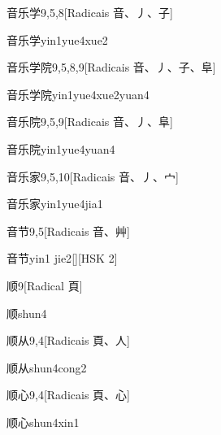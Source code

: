 \begin{entry}{音乐学}{9,5,8}[Radicais ⾳、⼃、⼦]
  \begin{phonetics}{音乐学}{yin1yue4xue2}
  \end{phonetics}
\end{entry}

\begin{entry}{音乐学院}{9,5,8,9}[Radicais ⾳、⼃、⼦、⾩]
  \begin{phonetics}{音乐学院}{yin1yue4xue2yuan4}
  \end{phonetics}
\end{entry}

\begin{entry}{音乐院}{9,5,9}[Radicais ⾳、⼃、⾩]
  \begin{phonetics}{音乐院}{yin1yue4yuan4}
  \end{phonetics}
\end{entry}

\begin{entry}{音乐家}{9,5,10}[Radicais ⾳、⼃、⼧]
  \begin{phonetics}{音乐家}{yin1yue4jia1}
  \end{phonetics}
\end{entry}

\begin{entry}{音节}{9,5}[Radicais ⾳、⾋]
  \begin{phonetics}{音节}{yin1 jie2}[][HSK 2]
  \end{phonetics}
\end{entry}

\begin{entry}{顺}{9}[Radical ⾴]
  \begin{phonetics}{顺}{shun4}
  \end{phonetics}
\end{entry}

\begin{entry}{顺从}{9,4}[Radicais ⾴、⼈]
  \begin{phonetics}{顺从}{shun4cong2}
  \end{phonetics}
\end{entry}

\begin{entry}{顺心}{9,4}[Radicais ⾴、⼼]
  \begin{phonetics}{顺心}{shun4xin1}
  \end{phonetics}
\end{entry}

